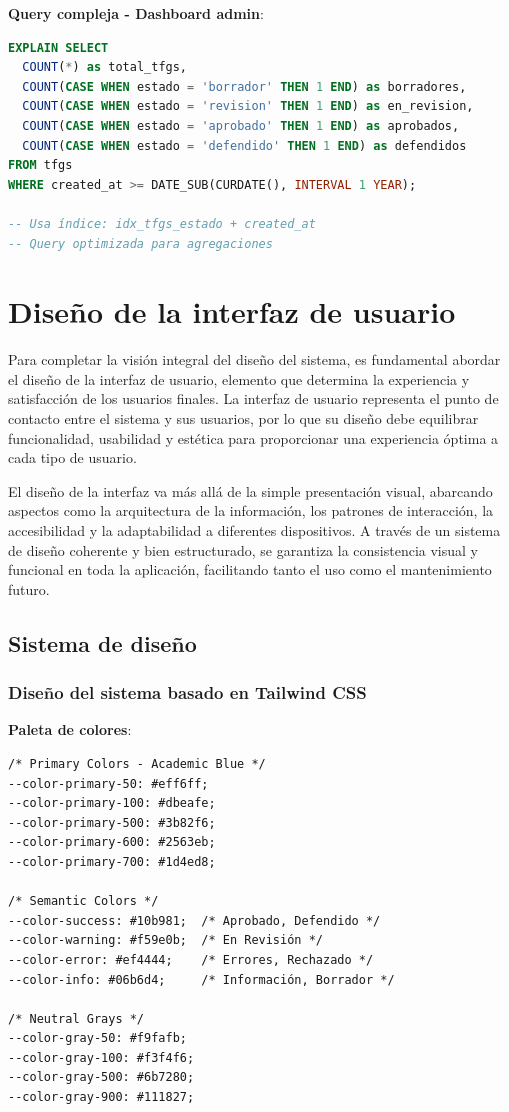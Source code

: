 \documentclass[12pt,a4paper,oneside]{report}
\begin{document}
\textbf{Query compleja - Dashboard admin}:

\begin{lstlisting}[language=SQL]
EXPLAIN SELECT 
  COUNT(*) as total_tfgs,
  COUNT(CASE WHEN estado = 'borrador' THEN 1 END) as borradores,
  COUNT(CASE WHEN estado = 'revision' THEN 1 END) as en_revision,
  COUNT(CASE WHEN estado = 'aprobado' THEN 1 END) as aprobados,
  COUNT(CASE WHEN estado = 'defendido' THEN 1 END) as defendidos
FROM tfgs 
WHERE created_at >= DATE_SUB(CURDATE(), INTERVAL 1 YEAR);

-- Usa índice: idx_tfgs_estado + created_at
-- Query optimizada para agregaciones
\end{lstlisting}

\section{Diseño de la interfaz de
usuario}\label{diseuxf1o-de-la-interfaz-de-usuario}

Para completar la visión integral del diseño del sistema, es fundamental
abordar el diseño de la interfaz de usuario, elemento que determina la
experiencia y satisfacción de los usuarios finales. La interfaz de
usuario representa el punto de contacto entre el sistema y sus usuarios,
por lo que su diseño debe equilibrar funcionalidad, usabilidad y
estética para proporcionar una experiencia óptima a cada tipo de
usuario.

El diseño de la interfaz va más allá de la simple presentación visual,
abarcando aspectos como la arquitectura de la información, los patrones
de interacción, la accesibilidad y la adaptabilidad a diferentes
dispositivos. A través de un sistema de diseño coherente y bien
estructurado, se garantiza la consistencia visual y funcional en toda la
aplicación, facilitando tanto el uso como el mantenimiento futuro.

\subsection{Sistema de diseño}\label{sistema-de-diseuxf1o}

\subsubsection{Diseño del sistema basado en Tailwind
CSS}\label{design-system-basado-en-tailwind-css}

\textbf{Paleta de colores}:

\begin{lstlisting}
/* Primary Colors - Academic Blue */
--color-primary-50: #eff6ff;
--color-primary-100: #dbeafe;
--color-primary-500: #3b82f6;
--color-primary-600: #2563eb;
--color-primary-700: #1d4ed8;

/* Semantic Colors */
--color-success: #10b981;  /* Aprobado, Defendido */
--color-warning: #f59e0b;  /* En Revisión */
--color-error: #ef4444;    /* Errores, Rechazado */
--color-info: #06b6d4;     /* Información, Borrador */

/* Neutral Grays */
--color-gray-50: #f9fafb;
--color-gray-100: #f3f4f6;
--color-gray-500: #6b7280;
--color-gray-900: #111827;
\end{lstlisting}
\end{document}
